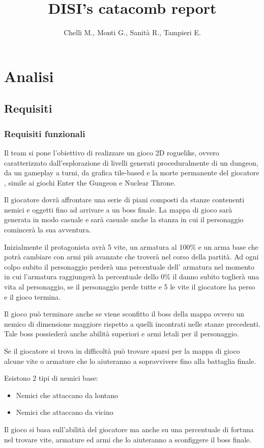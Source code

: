 \documentclass[a4paper]{report}
\title{DISI's catacomb report}
\author{Chelli M., Monti G., Sanità R., Tampieri E.}
\begin{document}
	\maketitle
	\tableofcontents
	\chapter{Analisi}
	\section{Requisiti}
	\subsection{Requisiti funzionali}
	\par Il team si pone l'obiettivo di realizzare un gioco 2D roguelike,
	ovvero caratterizzato dall'esplorazione di livelli generati proceduralmente
	di un dungeon, da un gameplay a turni, da grafica tile-based e la morte
	permanente del giocatore \cite{wiki:Roguelike}, simile ai giochi Enter the
	Gungeon e Nuclear Throne.
	\par Il giocatore dovrà affrontare una serie di piani composti da stanze contenenti
	nemici e oggetti fino ad arrivare a un boss finale. La mappa di gioco sarà generata
	in modo casuale e sarà casuale anche la stanza in cui il personaggio comincerà
	la sua avventura.
	\par Inizialmente il protagonista avrà 5 vite, un armatura al 100\%
	e un arma base che potrà cambiare con armi più avanzate che troverà nel corso
	della partità. Ad ogni colpo subito il personaggio perderà una percentuale dell'
	armatura nel momento in cui l'armatura raggiungerà la percentuale dello 0\%
	il danno subito toglierà una vita al personaggio, se il personaggio perde tutte
	e 5 le vite il giocatore ha perso e il gioco termina.
	\par Il gioco può terminare anche se viene sconfitto il boss della mappa ovvero
	un nemico di dimensione maggiore rispetto a quelli incontrati nelle stanze precedenti.
	Tale boss possiederà anche abilità superiori e armi letali per il personaggio.
	\par Se il giocatore si trova in difficoltà può trovare sparsi per la mappa di gioco
	alcune vite o armature che lo aiuteranno a sopravvivere fino alla battaglia finale.
	\par Esistono 2 tipi di nemici base:
	\begin{itemize}
		\item Nemici che attaccano da lontano
		\item Nemici che attaccano da vicino
	\end{itemize}
	\par Il gioco si basa sull'abilità del giocatore ma anche su una percentuale di
	fortuna nel trovare vite, armature ed armi che lo aiuteranno a sconfiggere il
	boss finale.
\end{document}
